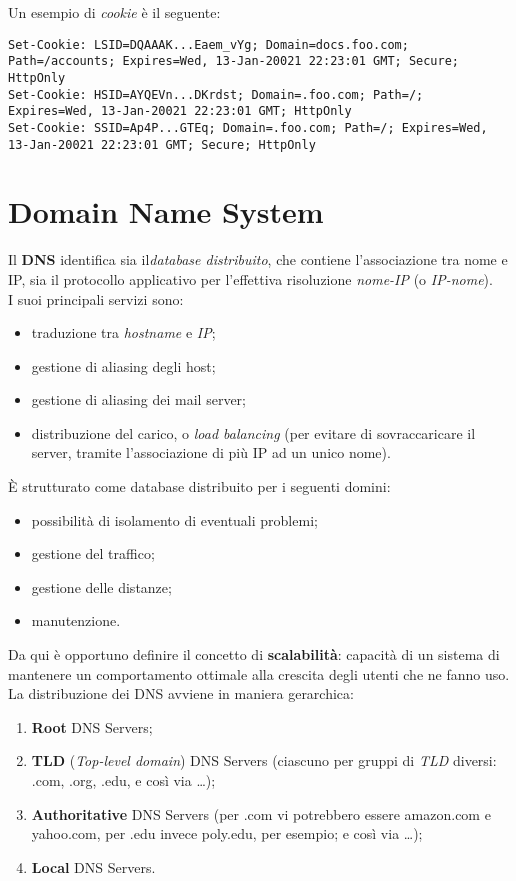 Un esempio di \textit{cookie} è il seguente:
\begin{lstlisting}
Set-Cookie: LSID=DQAAAK...Eaem_vYg; Domain=docs.foo.com; Path=/accounts; Expires=Wed, 13-Jan-20021 22:23:01 GMT; Secure; HttpOnly
Set-Cookie: HSID=AYQEVn...DKrdst; Domain=.foo.com; Path=/; Expires=Wed, 13-Jan-20021 22:23:01 GMT; HttpOnly
Set-Cookie: SSID=Ap4P...GTEq; Domain=.foo.com; Path=/; Expires=Wed, 13-Jan-20021 22:23:01 GMT; Secure; HttpOnly
\end{lstlisting}

\section{Domain Name System}
Il \textbf{DNS} identifica sia il\textit{database distribuito}, che contiene l'associazione tra nome e IP, sia il protocollo applicativo per l'effettiva risoluzione \textit{nome-IP} (o \textit{IP-nome}). \\
I suoi principali servizi sono:
\begin{itemize}
	\item traduzione tra \textit{hostname} e \textit{IP};
	\item gestione di aliasing degli host;
	\item gestione di aliasing dei mail server;
	\item distribuzione del carico, o \textit{load balancing} (per evitare di sovraccaricare il server, tramite l'associazione di più IP ad un unico nome).
\end{itemize}
È strutturato come database distribuito per i seguenti domini:
\begin{itemize}
	\item possibilità di isolamento di eventuali problemi;
	\item gestione del traffico;
	\item gestione delle distanze;
	\item manutenzione.
\end{itemize}
Da qui è opportuno definire il concetto di \textbf{scalabilità}: capacità di un sistema di mantenere un comportamento ottimale alla crescita degli utenti che ne fanno uso. \\
La distribuzione dei DNS avviene in maniera gerarchica:
\begin{enumerate}
    \item \textbf{Root} DNS Servers;
    \item \textbf{TLD} (\textit{Top-level domain}) DNS Servers (ciascuno per gruppi di \textit{TLD} diversi: .com, .org, .edu, e così via \ldots);
    \item \textbf{Authoritative} DNS Servers (per .com vi potrebbero essere amazon.com e yahoo.com, per .edu invece poly.edu, per esempio; e così via \ldots);
    \item \textbf{Local} DNS Servers.
\end{enumerate}

